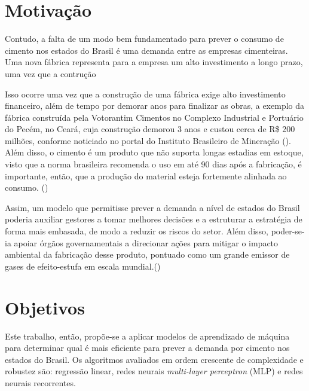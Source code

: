 \section*{Motivação}

Contudo, a falta de um modo bem fundamentado para prever o 
consumo de cimento nos estados do Brasil é 
uma demanda entre as empresas cimenteiras. Uma nova fábrica 
representa para a empresa um alto investimento a longo prazo,
uma vez que a contrução 

Isso ocorre 
uma vez que a construção de uma fábrica exige alto investimento
financeiro, além de tempo por demorar anos para finalizar as obras, 
a exemplo da fábrica construída pela Votorantim Cimentos no Complexo 
Industrial e Portuário do Pecém, no Ceará, cuja construção 
demorou 3 anos e custou cerca de R\$ 200 milhões, conforme 
noticiado no portal do Instituto Brasileiro de Mineração 
(\cite{fabrica-noticia}).
Além disso, o cimento é um produto que não suporta longas 
estadias em estoque, visto que a norma brasileira recomenda
o uso em até 90 dias após a fabricação, é importante, então, que 
a produção do material esteja fortemente alinhada ao 
consumo. (\cite{abnt})

Assim, um modelo que permitisse prever a demanda a nível de 
estados do Brasil poderia auxiliar gestores a tomar melhores 
decisões e a estruturar a estratégia de forma mais embasada, de 
modo a reduzir os riscos do setor. Além disso, poder-se-ia apoiar órgãos 
governamentais a direcionar ações para mitigar o impacto ambiental da
fabricação desse produto, pontuado como um grande emissor de 
gases de efeito-estufa em escala mundial.(\cite{meio-ambiente})


\section*{Objetivos}

Este trabalho, então, propõe-se a  aplicar modelos de aprendizado 
de máquina para determinar qual é mais eficiente para prever a 
demanda por cimento nos estados do Brasil. Os algoritmos avaliados em ordem 
crescente de complexidade e robustez são: 
regressão linear, redes neurais  \textit{multi-layer perceptron} (MLP) 
e redes neurais recorrentes.



